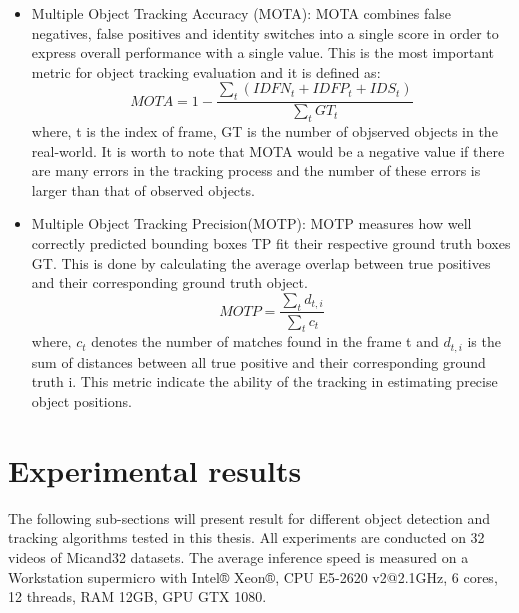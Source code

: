 \begin{itemize}
	\item Multiple Object Tracking Accuracy (MOTA): MOTA combines false negatives, false positives and identity switches into a single score in order to express overall performance with a single value. This is the most important metric for object tracking evaluation and it is defined as:
	\begin{equation}
		MOTA = 1 - \frac{\sum _t (IDFN_t+IDFP_t+IDS_t)}{\sum _t GT_t}
	\end{equation}
where, t is the index of frame, GT is the number of objserved objects in the real-world. It is worth to note that MOTA would be a negative value if there are many errors in the tracking process and the number of these errors is larger than that of observed objects.
	\item Multiple Object Tracking Precision(MOTP): MOTP measures how well correctly predicted bounding boxes TP fit their respective ground truth boxes GT. This is done by calculating the average overlap between true positives and their corresponding ground truth object.
	\begin{equation}
		MOTP = \frac{\sum _t d_{t,i}}{\sum _t c_t}
	\end{equation}
where, \(c_t\) denotes the number of matches found in the frame t and \(d_{t,i}\) is the sum of distances between all true positive and their corresponding ground truth i. This metric indicate the ability of the tracking in estimating precise object positions.
\end{itemize}
\section{Experimental results}
The following sub-sections will present result for different object detection and tracking algorithms tested in this thesis. All experiments are conducted on 32 videos of Micand32 datasets. The average inference speed is measured on a Workstation supermicro with Intel® Xeon®, CPU E5-2620 v2@2.1GHz, 6 cores, 12 threads, RAM 12GB, GPU GTX 1080.
